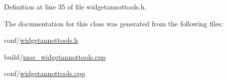 Definition at line 35 of file widgetannottools.\+h.



The documentation for this class was generated from the following files\+:\begin{DoxyCompactItemize}
\item 
conf/\hyperlink{widgetannottools_8h}{widgetannottools.\+h}\item 
build/\hyperlink{moc__widgetannottools_8cpp}{moc\+\_\+widgetannottools.\+cpp}\item 
conf/\hyperlink{widgetannottools_8cpp}{widgetannottools.\+cpp}\end{DoxyCompactItemize}
